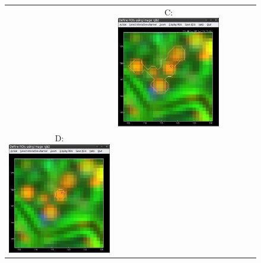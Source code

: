 \begin{figure}[!ht]
\begin{tabular}{cccccc}
&
C: \includegraphics[scale=0.23]{figs3/LANS-roi-interactive2}
\\[5mm]
D: \includegraphics[scale=0.23]{figs3/LANS-roi-interactive3}

\end{tabular}
\end{figure}
